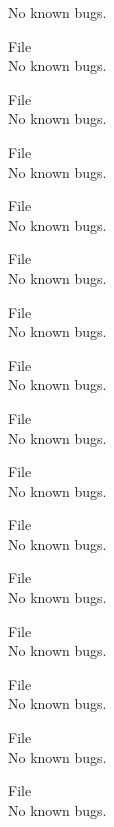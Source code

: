 \begin{DoxyRefList}
No known bugs.  
\item[File \doxylink{_r__y_8hpp}{R\+\_\+y.hpp} ]\hfill \\
\label{bug__bug000036}%
%
No known bugs.  
\item[File \doxylink{_r__z_8cpp}{R\+\_\+z.cpp} ]\hfill \\
\label{bug__bug000080}%
%
No known bugs.  
\item[File \doxylink{_r__z_8hpp}{R\+\_\+z.hpp} ]\hfill \\
\label{bug__bug000037}%
%
No known bugs.  
\item[File \doxylink{_s_a_t___const_8hpp}{SAT\+\_\+\+Const.hpp} ]\hfill \\
\label{bug__bug000038}%
%
No known bugs.  
\item[File \doxylink{sign___8cpp}{sign\+\_\+.cpp} ]\hfill \\
\label{bug__bug000081}%
%
No known bugs.  
\item[File \doxylink{sign___8hpp}{sign\+\_\+.hpp} ]\hfill \\
\label{bug__bug000039}%
%
No known bugs.  
\item[File \doxylink{tests_8cpp}{tests.cpp} ]\hfill \\
\label{bug__bug000087}%
%
No known bugs.  
\item[File \doxylink{timediff_8cpp}{timediff.cpp} ]\hfill \\
\label{bug__bug000082}%
%
No known bugs.  
\item[File \doxylink{timediff_8hpp}{timediff.hpp} ]\hfill \\
\label{bug__bug000040}%
%
No known bugs.  
\item[File \doxylink{_time_update_8cpp}{Time\+Update.cpp} ]\hfill \\
\label{bug__bug000083}%
%
No known bugs.  
\item[File \doxylink{_time_update_8hpp}{Time\+Update.hpp} ]\hfill \\
\label{bug__bug000041}%
%
No known bugs.  
\item[File \doxylink{unit_8cpp}{unit.cpp} ]\hfill \\
\label{bug__bug000084}%
%
No known bugs.  
\item[File \doxylink{unit_8hpp}{unit.hpp} ]\hfill \\
\label{bug__bug000042}%
%
No known bugs.  
\item[File \doxylink{_var_eqn_8cpp}{Var\+Eqn.cpp} ]\hfill \\
\label{bug__bug000085}%
%
No known bugs.  
\item[File \doxylink{_var_eqn_8hpp}{Var\+Eqn.hpp} ]\hfill \\
\label{bug__bug000043}%
%
No known bugs. 
\end{DoxyRefList}